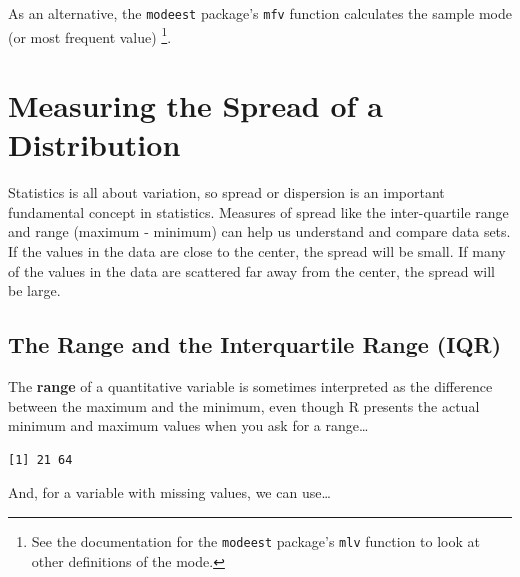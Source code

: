 \documentclass[
]{book}
\newenvironment{Shaded}{\begin{snugshade}}{\end{snugshade}}
\newcommand{\DataTypeTok}[1]{\textcolor[rgb]{0.13,0.29,0.53}{#1}}
\newcommand{\KeywordTok}[1]{\textcolor[rgb]{0.13,0.29,0.53}{\textbf{#1}}}
\newcommand{\NormalTok}[1]{#1}
\newcommand{\OperatorTok}[1]{\textcolor[rgb]{0.81,0.36,0.00}{\textbf{#1}}}
\newcommand{\OtherTok}[1]{\textcolor[rgb]{0.56,0.35,0.01}{#1}}
\newcommand{\StringTok}[1]{\textcolor[rgb]{0.31,0.60,0.02}{#1}}
\begin{document}
As an alternative, the \texttt{modeest} package's \texttt{mfv} function calculates the sample mode (or most frequent value) \footnote{See the documentation for the \texttt{modeest} package's \texttt{mlv} function to look at other definitions of the mode.}.

\hypertarget{measuring-the-spread-of-a-distribution}{%
\section{Measuring the Spread of a Distribution}\label{measuring-the-spread-of-a-distribution}}

Statistics is all about variation, so spread or dispersion is an important fundamental concept in statistics. Measures of spread like the inter-quartile range and range (maximum - minimum) can help us understand and compare data sets. If the values in the data are close to the center, the spread will be small. If many of the values in the data are scattered far away from the center, the spread will be large.

\hypertarget{rangeandiqr}{%
\subsection{The Range and the Interquartile Range (IQR)}\label{rangeandiqr}}

The \textbf{range} of a quantitative variable is sometimes interpreted as the difference between the maximum and the minimum, even though R presents the actual minimum and maximum values when you ask for a range\ldots{}

\begin{Shaded}
\end{Shaded}

\begin{verbatim}
[1] 21 64
\end{verbatim}

And, for a variable with missing values, we can use\ldots{}

\begin{Shaded}
\end{Shaded}
\end{document}
